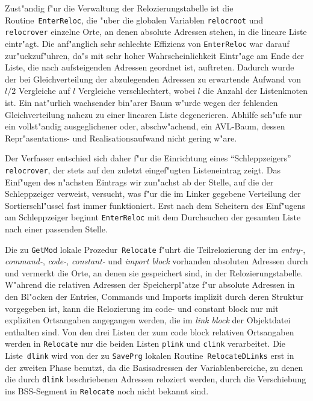 Zust"andig f"ur die Verwaltung der Relozierungstabelle ist die
Routine~{\tt EnterReloc}, die "uber die globalen Variablen {\tt relocroot} und
{\tt relocrover} einzelne Orte, an denen absolute Adressen stehen, in die
lineare Liste eintr"agt.
Die anf"anglich sehr schlechte Effizienz von {\tt EnterReloc} war darauf
zur"uckzuf"uhren, da"s mit sehr hoher Wahrscheinlichkeit Eintr"age
am Ende der Liste, die nach aufsteigenden Adressen geordnet ist, auftreten.
Dadurch wurde der bei Gleichverteilung der abzulegenden Adressen zu
erwartende Aufwand von $l/2$ Vergleiche auf $l$ Vergleiche verschlechtert,
wobei $l$ die Anzahl der Listenknoten ist.
Ein nat"urlich wachsender bin"arer Baum w"urde wegen der fehlenden Gleichverteilung
nahezu zu einer linearen Liste degenerieren.
Abhilfe sch"ufe nur ein vollst"andig ausgeglichener oder, abschw"achend, ein
AVL-Baum, dessen Repr"asentations- und Realisationsaufwand nicht gering w"are.

Der Verfasser entschied sich daher f"ur die Einrichtung eines "`Schleppzeigers"'
{\tt relocrover}, der stets auf den zuletzt eingef"ugten Listeneintrag
zeigt.
Das Einf"ugen des n"achsten Eintrags wir zun"achst ab der Stelle, auf die
der Schleppzeiger verweist, versucht, was f"ur die im Linker gegebene
Verteilung der Sortierschl"ussel fast immer funktioniert.
Erst nach dem Scheitern des Einf"ugens am Schleppzeiger beginnt {\tt EnterReloc}
mit dem Durchsuchen der gesamten Liste nach einer passenden Stelle.

\medskip
Die zu {\tt GetMod} lokale Prozedur~{\tt Relocate} f"uhrt die Teilrelozierung
der im {\it entry-}, {\it command-}, {\it code-}, {\it constant-} und
{\it import block} vorhanden absoluten Adressen durch und vermerkt die Orte,
an denen sie gespeichert sind, in der Relozierungstabelle.
W"ahrend die relativen Adressen der Speicherpl"atze f"ur absolute Adressen
in den Bl"ocken der Entries, Commands und Imports implizit durch deren
Struktur vorgegeben ist, kann die Relozierung im code- und constant block nur
mit expliziten Ortsangaben angegangen werden, die im {\it link block\/} der
Objektdatei enthalten sind.
Von den drei Listen der zum code block relativen Ortsangaben werden in
{\tt Relocate} nur die beiden Listen {\tt plink} und {\tt clink} verarbeitet.
Die Liste~{\tt dlink} wird von der zu {\tt SavePrg} lokalen
Routine~{\tt RelocateDLinks} erst in der zweiten Phase benutzt,
da die Basisadressen
der Variablenbereiche, zu denen die durch {\tt dlink} beschriebenen Adressen
reloziert werden, durch die Verschiebung ins BSS-Segment in {\tt Relocate}
noch nicht bekannt sind.

